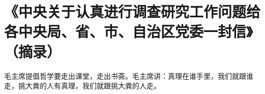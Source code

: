 \section[《中央关于认真进行调查研究工作问题给各中央局、省、市、自治区党委一封信》（摘录）（一九六一年三月二十七日）]{《中央关于认真进行调查研究工作问题给各中央局、省、市、自治区党委一封信》（摘录）}

毛主席提倡哲学要走出课堂，走出书斋。毛主席讲：真理在谁手里，我们就跟谁走，挑大粪的人有真理，我们就跟挑大粪的人走。
